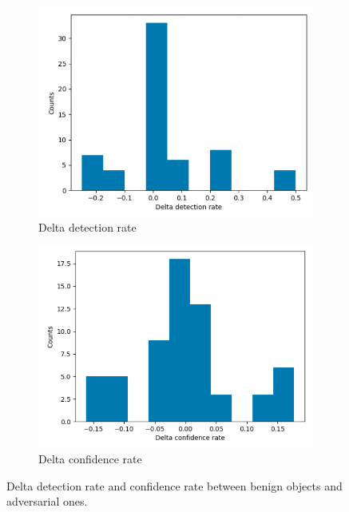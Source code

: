\begin{figure}
	\centering
	\begin{subfigure}{0.5\textwidth}
		\centering
		\includegraphics[width=0.7\linewidth]{figure/detection-de.png}
		\caption{Delta detection rate}
		\label{fig:det-d}
	\end{subfigure}%
	\begin{subfigure}{0.5\textwidth}
		\centering
		\includegraphics[width=0.7\linewidth]{figure/conf-de.png}
		\caption{Delta confidence rate}
		\label{fig:conf-d}
	\end{subfigure}
	\caption{Delta detection rate and confidence rate between benign objects and adversarial ones.}
	\label{fig:delta}
\end{figure}


